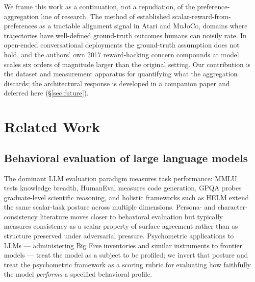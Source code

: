 \documentclass{article}
\begin{document}
We frame this work as a continuation, not a repudiation, of the preference-aggregation line of research. The method of \citet{christiano2017deep} established scalar-reward-from-preferences as a tractable alignment signal in Atari and MuJoCo, domains where trajectories have well-defined ground-truth outcomes humans can noisily rate. In open-ended conversational deployments the ground-truth assumption does not hold, and the authors' own 2017 reward-hacking concern compounds at model scales six orders of magnitude larger than the original setting. Our contribution is the dataset and measurement apparatus for quantifying what the aggregation discards; the architectural response is developed in a companion paper and deferred here (\S\ref{sec:future}).

\section{Related Work}
\label{sec:related}

\subsection{Behavioral evaluation of large language models}
The dominant LLM evaluation paradigm measures task performance: MMLU \citep{hendrycks2021measuring} tests knowledge breadth, HumanEval \citep{chen2021evaluating} measures code generation, GPQA \citep{rein2023gpqa} probes graduate-level scientific reasoning, and holistic frameworks such as HELM extend the same scalar-task posture across multiple dimensions. Persona- and character-consistency literature \citep{sharma2024sycophancy, perez2022discovering} moves closer to behavioral evaluation but typically measures consistency as a scalar property of surface agreement rather than as structure preserved under adversarial pressure. Psychometric applications to LLMs --- administering Big Five inventories and similar instruments to frontier models --- treat the model as a subject to be profiled; we invert that posture and treat the psychometric framework as a scoring rubric for evaluating how faithfully the model \emph{performs} a specified behavioral profile.
\end{document}

